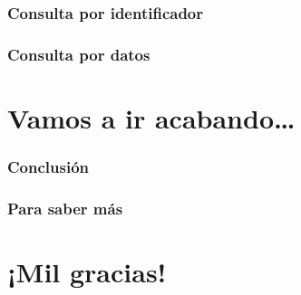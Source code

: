 \documentclass{beamer}
\begin{document}
\begin{frame}[fragile]
\frametitle{Consulta por identificador}

\end{frame}

\begin{frame}[fragile]
\frametitle{Consulta por datos}

\end{frame}

\section{Vamos a ir acabando\dots}

\begin{frame}[fragile]
\frametitle{Conclusión}

\end{frame}

\begin{frame}[fragile]
\frametitle{Para saber más}

\end{frame}

\section{¡Mil gracias!}
\end{document}
